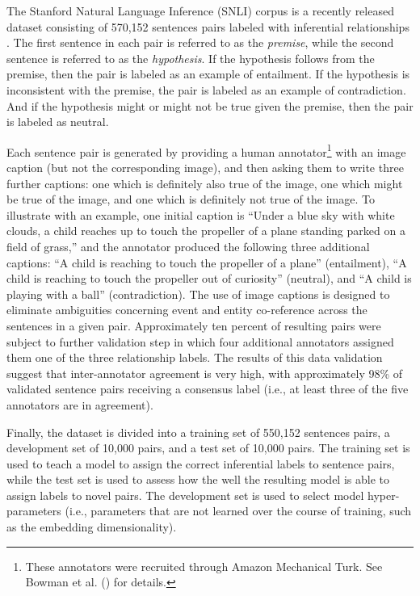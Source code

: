 The Stanford Natural Language Inference (SNLI) corpus is a recently released dataset consisting of 570,152 sentences pairs labeled with inferential relationships \citep{Bowman:2015}. The first sentence in each pair is referred to as the \textit{premise}, while the second sentence is referred to as the \textit{hypothesis}. If the hypothesis follows from the premise, then the pair is labeled as an example of entailment. If the hypothesis is inconsistent with the premise, the pair is labeled as an example of contradiction. And if the hypothesis might or might not be true given the premise, then the pair is labeled as neutral.

Each sentence pair is generated by providing a human annotator\footnote{These annotators were recruited through Amazon Mechanical Turk. See Bowman et al. (\citeyear{Bowman:2015}) for details.} with an image caption (but not the corresponding image), and then asking them to write three further captions: one which is definitely also true of the image, one which might be true of the image, and one which is definitely not true of the image. To illustrate with an example, one initial caption is ``Under a blue sky with white clouds, a child reaches up to touch the propeller of a plane standing parked on a field of grass,'' and the annotator produced the following three additional captions: ``A child is reaching to touch the propeller of a plane'' (entailment), ``A child is reaching to touch the propeller out of curiosity'' (neutral), and ``A child is playing with a ball'' (contradiction). The use of image captions is designed to eliminate ambiguities concerning event and entity co-reference across the sentences in a given pair. Approximately ten percent of resulting pairs were subject to further validation step in which four additional annotators assigned them one of the three relationship labels. The results of this data validation suggest that inter-annotator agreement is very high, with approximately 98\% of validated sentence pairs receiving a consensus label (i.e., at least three of the five annotators are in agreement). 

Finally, the dataset is divided into a training set of 550,152 sentences pairs, a development set of 10,000 pairs, and a test set of 10,000 pairs. The training set is used to teach a model to assign the correct inferential labels to sentence pairs, while the test set is used to assess how the well the resulting model is able to assign labels to novel pairs. The development set is used to select model hyper-parameters (i.e., parameters that are not learned over the course of training, such as the embedding dimensionality). 

